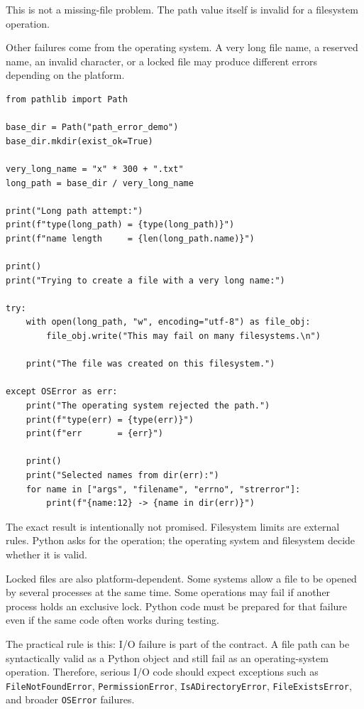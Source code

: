 This is not a missing-file problem. The path value itself is invalid for a filesystem operation.

Other failures come from the operating system. A very long file name, a reserved name, an invalid character, or a locked file may produce different errors depending on the platform.

\begin{verbatim}
from pathlib import Path

base_dir = Path("path_error_demo")
base_dir.mkdir(exist_ok=True)

very_long_name = "x" * 300 + ".txt"
long_path = base_dir / very_long_name

print("Long path attempt:")
print(f"type(long_path) = {type(long_path)}")
print(f"name length     = {len(long_path.name)}")

print()
print("Trying to create a file with a very long name:")

try:
    with open(long_path, "w", encoding="utf-8") as file_obj:
        file_obj.write("This may fail on many filesystems.\n")

    print("The file was created on this filesystem.")

except OSError as err:
    print("The operating system rejected the path.")
    print(f"type(err) = {type(err)}")
    print(f"err       = {err}")

    print()
    print("Selected names from dir(err):")
    for name in ["args", "filename", "errno", "strerror"]:
        print(f"{name:12} -> {name in dir(err)}")
\end{verbatim}

The exact result is intentionally not promised. Filesystem limits are external rules. Python asks for the operation; the operating system and filesystem decide whether it is valid.

Locked files are also platform-dependent. Some systems allow a file to be opened by several processes at the same time. Some operations may fail if another process holds an exclusive lock. Python code must be prepared for that failure even if the same code often works during testing.

The practical rule is this: I/O failure is part of the contract. A file path can be syntactically valid as a Python object and still fail as an operating-system operation. Therefore, serious I/O code should expect exceptions such as \texttt{FileNotFoundError}, \texttt{PermissionError}, \texttt{IsADirectoryError}, \texttt{FileExistsError}, and broader \texttt{OSError} failures.